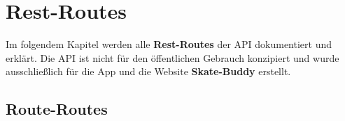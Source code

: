 \label{restroutes}

\chapter{Rest-Routes}

Im folgendem Kapitel werden alle \textbf{Rest-Routes} der API
dokumentiert und erklärt. Die API ist nicht für den öffentlichen Gebrauch
konzipiert und wurde ausschließlich für die App und die Website \textbf{Skate-Buddy}
erstellt.

\section{Route-Routes}

